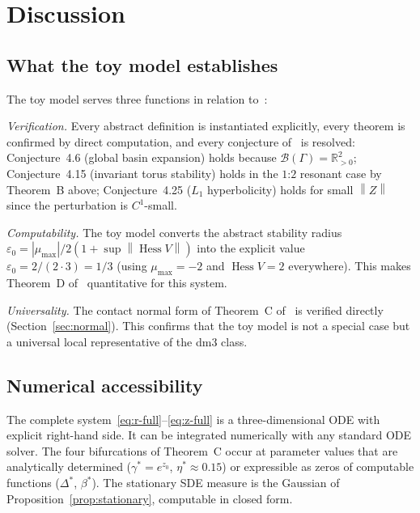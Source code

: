 \documentclass[12pt, oneside]{book}
\theoremstyle{plain}
\theoremstyle{definition}
\theoremstyle{remark}
\newcommand{\R}{\mathbb{R}}
\newcommand{\Orb}{\Gamma}
\newcommand{\cB}{\mathcal{B}}
\newcommand{\norm}[1]{\left\|#1\right\|}
\newcommand{\abs}[1]{\left|#1\right|}
\DeclareMathOperator{\Hess}{Hess}
\begin{document}
\section{Discussion}\label{sec:discussion}

\subsection{What the toy model establishes}

The toy model serves three functions in relation to~\cite{Paper1}:

\emph{Verification.} Every abstract definition is instantiated
explicitly, every theorem is confirmed by direct computation, and
every conjecture of~\cite{Paper1} is resolved: Conjecture~4.6
(global basin expansion) holds because $\cB(\Orb)=\R^2_{>0}$;
Conjecture~4.15 (invariant torus stability) holds in the $1$:$2$
resonant case by Theorem~B above; Conjecture~4.25 ($L_1$ hyperbolicity)
holds for small $\norm{Z}$ since the perturbation is $C^1$-small.

\emph{Computability.} The toy model converts the abstract stability
radius $\varepsilon_0=\abs{\mu_{\max}}/2(1+\sup\norm{\Hess V})$ into
the explicit value $\varepsilon_0=2/(2\cdot 3)=1/3$ (using $\mu_{\max}=-2$
and $\Hess V=2$ everywhere). This makes Theorem~D of~\cite{Paper1}
quantitative for this system.

\emph{Universality.} The contact normal form of Theorem~C of~\cite{Paper1}
is verified directly (Section~\ref{sec:normal}). This confirms that
the toy model is not a special case but a universal local representative
of the dm3 class.

\subsection{Numerical accessibility}

The complete system~\eqref{eq:r-full}--\eqref{eq:z-full} is a three-dimensional
ODE with explicit right-hand side. It can be integrated numerically
with any standard ODE solver. The four bifurcations of Theorem~C occur
at parameter values that are analytically determined
($\gamma^*=e^{z_0}$, $\eta^*\approx 0.15$) or expressible as zeros
of computable functions ($\Delta^*$, $\beta^*$). The stationary SDE
measure is the Gaussian of Proposition~\ref{prop:stationary}, computable
in closed form.
\end{document}
